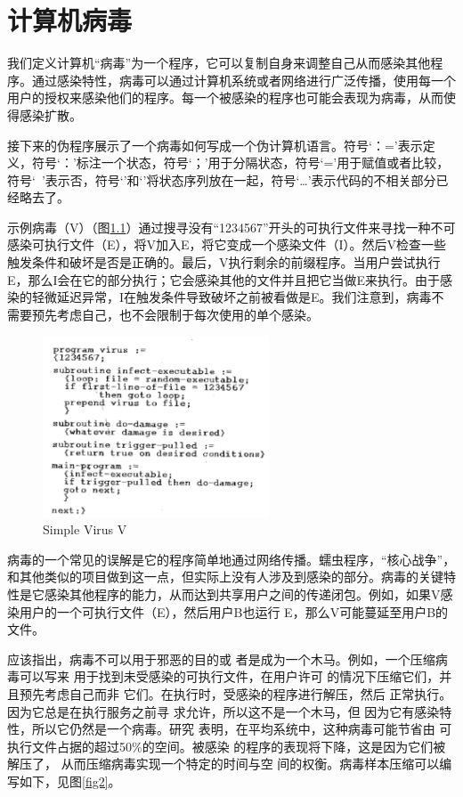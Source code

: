 \chapter{计算机病毒}

我们定义计算机“病毒”为一个程序，它可以复制自身来调整自己从而感染其他程序。通过感染特性，病毒可以通过计算机系统或者网络进行广泛传播，使用每一个用户的授权来感染他们的程序。每一个被感染的程序也可能会表现为病毒，从而使得感染扩散。


接下来的伪程序展示了一个病毒如何写成一个伪计算机语言。符号‘：=’表示定义，符号‘：’标注一个状态，符号‘；’用于分隔状态，符号‘=’用于赋值或者比较，符号‘~’表示否，符号‘{’和‘}’将状态序列放在一起，符号‘…’表示代码的不相关部分已经略去了。


示例病毒（V）（图\ref{fig1}）通过搜寻没有“1234567”开头的可执行文件来寻找一种不可感染可执行文件（E），将V加入E，将它变成一个感染文件（I）。然后V检查一些触发条件和破坏是否是正确的。最后，V执行剩余的前缀程序。当用户尝试执行E，那么I会在它的部分执行；它会感染其他的文件并且把它当做E来执行。由于感染的轻微延迟异常，I在触发条件导致破坏之前被看做是E。我们注意到，病毒不需要预先考虑自己，也不会限制于每次使用的单个感染。


\begin{figure}[h!]
    \centering
    \includegraphics[width=0.60\textwidth]{figure/fig1.png}
    \caption{Simple Virus V} 
    \label{fig1}
\end{figure} 


病毒的一个常见的误解是它的程序简单地通过网络传播。蠕虫程序，“核心战争”，和其他类似的项目做到这一点，但实际上没有人涉及到感染的部分。病毒的关键特性是它感染其他程序的能力，从而达到共享用户之间的传递闭包。例如，如果V感染用户的一个可执行文件（E），然后用户B也运行 E，那么V可能蔓延至用户B的文件。


应该指出，病毒不可以用于邪恶的目的或
者是成为一个木马。例如，一个压缩病毒可以写来
用于找到未受感染的可执行文件，在用户许可
的情况下压缩它们，并且预先考虑自己而非
它们。在执行时，受感染的程序进行解压，然后
正常执行。因为它总是在执行服务之前寻
求允许，所以这不是一个木马，但
因为它有感染特性，所以它仍然是一个病毒。研究
表明，在平均系统中，这种病毒可能节省由
可执行文件占据的超过50\%的空间。被感染
的程序的表现将下降，这是因为它们被解压了，
从而压缩病毒实现一个特定的时间与空
间的权衡。病毒样本压缩可以编写如下，见图\ref{fig2}。

